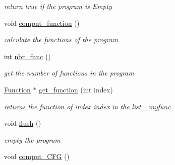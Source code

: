 \begin{DoxyCompactItemize}
\begin{DoxyCompactList}\small\item\em return true if the program is Empty \item\end{DoxyCompactList}\item 
\hypertarget{classProgram_aa2111257b1f690520316e4831e55798d}{
void \hyperlink{classProgram_aa2111257b1f690520316e4831e55798d}{comput\_\-function} ()}
\label{classProgram_aa2111257b1f690520316e4831e55798d}

\begin{DoxyCompactList}\small\item\em calculate the functions of the program \item\end{DoxyCompactList}\item 
\hypertarget{classProgram_aa85073d3bd6782af3759f4a2961ae80f}{
int \hyperlink{classProgram_aa85073d3bd6782af3759f4a2961ae80f}{nbr\_\-func} ()}
\label{classProgram_aa85073d3bd6782af3759f4a2961ae80f}

\begin{DoxyCompactList}\small\item\em get the number of functions in the program \item\end{DoxyCompactList}\item 
\hypertarget{classProgram_aea6d5c7367bbee48ec5cbb295ef6fd5f}{
\hyperlink{classFunction}{Function} $\ast$ \hyperlink{classProgram_aea6d5c7367bbee48ec5cbb295ef6fd5f}{get\_\-function} (int index)}
\label{classProgram_aea6d5c7367bbee48ec5cbb295ef6fd5f}

\begin{DoxyCompactList}\small\item\em returns the function of index index in the list \_\-myfunc \item\end{DoxyCompactList}\item 
\hypertarget{classProgram_a1cef65227311c68a2e81c89dcbc16914}{
void \hyperlink{classProgram_a1cef65227311c68a2e81c89dcbc16914}{flush} ()}
\label{classProgram_a1cef65227311c68a2e81c89dcbc16914}

\begin{DoxyCompactList}\small\item\em empty the program \item\end{DoxyCompactList}\item 
\hypertarget{classProgram_a0d1d9386925418b5fd0a09bf5de16208}{
void \hyperlink{classProgram_a0d1d9386925418b5fd0a09bf5de16208}{comput\_\-CFG} ()}
\label{classProgram_a0d1d9386925418b5fd0a09bf5de16208}


\end{DoxyCompactItemize}
